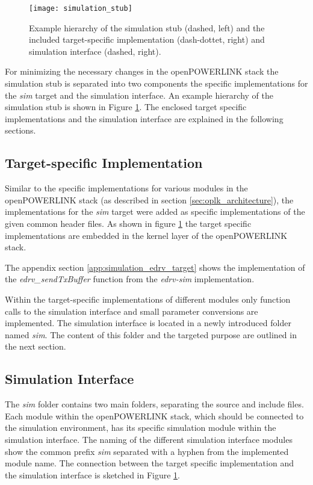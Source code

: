 \begin{figure}
    \centering
    \texttt{[image: simulation\_stub]}
    \caption{Example hierarchy of the simulation stub (dashed, left) and the included target-specific implementation (dash-dottet, right) and simulation interface (dashed, right).}
    \label{fig:simulation_stub}
\end{figure}

For minimizing the necessary changes in the openPOWERLINK stack the simulation stub is separated into two components the specific implementations for the \emph{sim} target and the simulation interface.
An example hierarchy of the simulation stub is shown in Figure \ref{fig:simulation_stub}.
The enclosed target specific implementations and the simulation interface are explained in the following sections.

\subsection{Target-specific Implementation}
\label{sec:porting_simstub_target}
\begin{sloppypar}
Similar to the specific implementations for various modules in the openPOWERLINK stack (as described in section \ref{sec:oplk_architecture}), the implementations for the \emph{sim} target were added as specific implementations of the given common header files.
As shown in figure \ref{fig:simulation_stub} the target specific implementations are embedded in the kernel layer of the openPOWERLINK stack.
\end{sloppypar}

\begin{sloppypar}
The appendix section \ref{app:simulation_edrv_target} shows the implementation of the \emph{edrv\_sendTxBuffer} function from the \emph{edrv-sim} implementation.
\end{sloppypar}

Within the target-specific implementations of different modules only function calls to the simulation interface and small parameter conversions are implemented.
The simulation interface is located in a newly introduced folder named \emph{sim}.
The content of this folder and the targeted purpose are outlined in the next section.

\subsection{Simulation Interface}
\label{sec:porting_simstub_siminterface}
The \emph{sim} folder contains two main folders, separating the source and include files.
Each module within the openPOWERLINK stack, which should be connected to the simulation environment, has its specific simulation module within the simulation interface.
The naming of the different simulation interface modules show the common prefix \emph{sim} separated with a hyphen from the implemented module name.
The connection between the target specific implementation and the simulation interface is sketched in Figure \ref{fig:simulation_stub}. 

